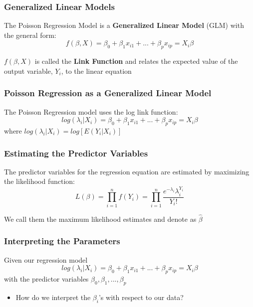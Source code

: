 \documentclass{beamer}
\begin{document}
\begin{frame}[fragile]\frametitle{Generalized Linear Models}

	The Poisson Regression Model is a \textbf{Generalized Linear Model} (GLM) with the general form:
	$$ f(\beta,X) = \beta_0 + \beta_1 x_{i1} + ... + \beta_p x_{ip} = X_i \beta $$

	$f(\beta,X)$ is called the \textbf{Link Function} and relates the expected value of the output variable, $Y_i$, to the linear equation
	
\end{frame}



\begin{frame}[fragile]\frametitle{Poisson Regression as a Generalized Linear Model}

	The Poisson Regression model uses the log link function:
 	$$ log(\lambda_i|X_i) = \beta_0 + \beta_1 x_{i1} + ... + \beta_p x_{ip} = X_i \beta $$  		
 	where $ log(\lambda_i|X_i) = log[E(Y_i|X_i)] $
		
	
\end{frame}



\begin{frame}[fragile]\frametitle{Estimating the Predictor Variables}

	The predictor variables for the regression equation are estimated by maximizing the likelihood function:
		$$ L(\beta) = \prod_{i=1}^{n} f(Y_i) = \prod_{i=1}^{n} \frac{ e^{-\lambda_i} \lambda_i^{Y_i} }{Y_i!} $$
		
	We call them the maximum likelihood estimates and denote as $\hat{\beta}$
	
\end{frame}



\begin{frame}[fragile]\frametitle{Interpreting the Parameters}	
	
	Given our regression model
	$$ log(\lambda_i|X_i) = \beta_0 + \beta_1 x_{i1} + ... + \beta_p x_{ip} = X_i \beta $$  
	with the predictor variables $\beta_0, \beta_1, ..., \beta_p$
	
	\begin{itemize}
	
		\item How do we interpret the $\beta_i$'s with respect to our data?	
	
	\end{itemize}
	
\end{frame}
\end{document}

